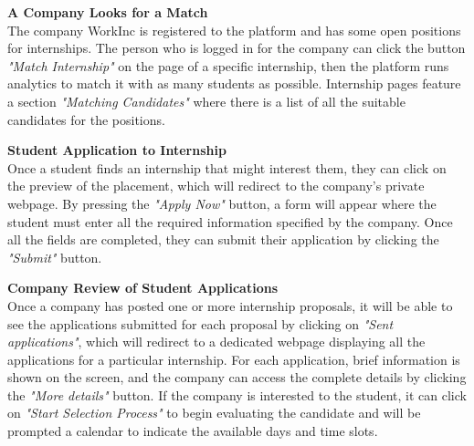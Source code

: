 {\begin{enumerate}[label=\textbf{[\arabic*]}, left = 0 pt, align = left]
            \item \textbf{A Company Looks for a Match}                  %
            \\The company WorkInc is registered to the platform and has some open positions for internships. The person who is logged in for the company can click the button \textit{"Match Internship"} on the page of a specific internship, then the platform runs analytics to match it with as many students as possible. Internship pages feature a section \textit{"Matching Candidates"} where there is a list of all the suitable candidates for the positions.
            
            \item \textbf{Student Application to Internship}                      
            \\Once a student finds an internship that might interest them, they can click on the preview of the placement, which will redirect to the company's private webpage. By pressing the \textit{"Apply Now"} button, a form will appear where the student must enter all the required information specified by the company. Once all the fields are completed, they can submit their application by clicking the \textit{"Submit"} button.
            
            \item \textbf{Company Review of Student Applications}           %
            \\Once a company has posted one or more internship proposals, it will be able to see the applications submitted for each proposal by clicking on \textit{"Sent applications"}, which will redirect to a dedicated webpage displaying all the applications for a particular internship. For each application, brief information is shown on the screen, and the company can access the complete details by clicking the \textit{"More details"} button. If the company is interested to the student, it can click on \textit{"Start Selection Process"} to begin evaluating the candidate and will be prompted a calendar to indicate the available days and time slots.
            

\end{enumerate}}
